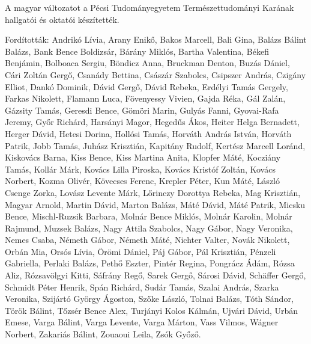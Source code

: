 {
A magyar változatot a Pécsi Tudományegyetem Természettudományi Karának hallgatói és oktatói készítették.

Fordították:
Andrikó Lívia, Arany Enikő,
Bakos Marcell, Bali Gina, Balázs Bálint Balázs, Bank Bence Boldizsár, Bárány Miklós, Bartha Valentina,
Békefi Benjámin, Bolboaca Sergiu, Böndicz Anna, Bruckman Denton, Buzás Dániel,
Cári Zoltán Gergő, Csanády Bettina, Császár Szabolcs, Csipszer András, Czigány Elliot,
Dankó Dominik, Dávid Gergő, Dávid Rebeka,
Erdélyi Tamás Gergely,
Farkas Nikolett, Flamann Luca, Fövenyessy Vivien,
Gajda Réka, Gál Zalán, Gázsity Tamás, Geresdi Bence, Gömöri Marin, Gulyás Fanni, Gyovai-Rafa Jeremy, Győr Richárd,
Harsányi Magor, Hegedűs Ákos, Heiter Helga Bernadett, Herger Dávid, Hetesi Dorina, Hollósi Tamás, Horváth András István, Horváth Patrik,
Jobb Tamás, Juhász Krisztián,
Kapitány Rudolf, Kertész Marcell Loránd, Kiskovács Barna, Kiss Bence, Kiss Martina Anita,
Klopfer Máté, Kocziány Tamás, Kollár Márk,
Kovács Lilla Piroska, Kovács Kristóf Zoltán, Kovács Norbert, Kozma Olivér, Kövecses Ferenc, Krepler Péter, Kun Máté,
László Csenge Zorka, Lovász Levente Márk, Lőrinczy Dorottya Rebeka,
Mag Krisztián, Magyar Arnold, Martin Dávid, Marton Balázs, Máté Dávid, Máté Patrik, Micsku Bence, Mischl-Ruzsik Barbara,
Molnár Bence Miklós, Molnár Karolin, Molnár Rajmund, Muzsek Balázs,
Nagy Attila Szabolcs, Nagy Gábor, Nagy Veronika, Nemes Csaba, Németh Gábor, Németh Máté, Nichter Valter, Novák Nikolett,
Orbán Mia, Orsós Lívia, Örömi Dániel,
Páj Gábor, Pál Krisztián, Pénzeli Gabriella, Perlaki Balázs, Pethő Eszter, Pintér Regina, Pongrácz Ádám,
Rózsa Aliz, Rózsavölgyi Kitti,
Sáfrány Regő, Sarek Gergő, Sárosi Dávid, Schäffer Gergő, Schmidt Péter Henrik, Spán Richárd, Sudár Tamás,
Szalai András, Szarka Veronika, Szijártó György Ágoston, Szőke László,
Tolnai Balázs, Tóth Sándor, Török Bálint, Tőzsér Bence Alex, Turjányi Kolos Kálmán, Ujvári Dávid, Urbán Emese,
Varga Bálint, Varga Levente, Varga Márton, Vass Vilmos,
Wágner Norbert,
Zakariás Bálint, Zouaoui Leila,
Zsók Győző.
}